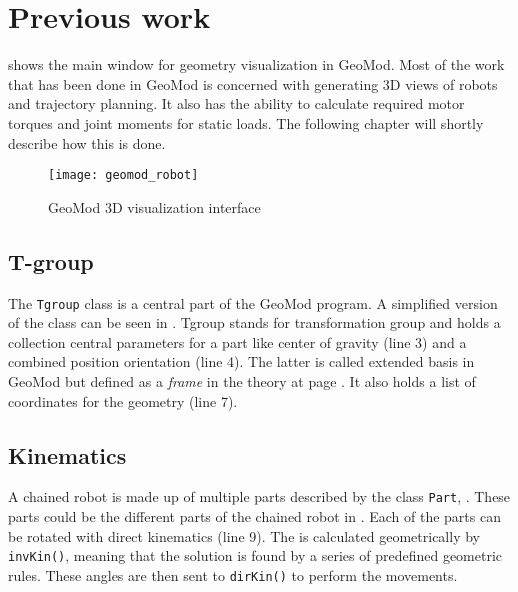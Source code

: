 \chapter{Previous work}\label{previous_work}

 shows the main window for geometry visualization in GeoMod. Most of the work that has been done in GeoMod is concerned with generating 3D views of robots and trajectory planning. It also has the ability to calculate required motor torques and joint moments for static loads. The following chapter will shortly describe how this is done. 

\begin{figure}
 \centering 
 \texttt{[image: geomod\_robot]}
 \caption{GeoMod 3D visualization interface}
 \label{geomod_interface}
\end{figure}

\section{T-group}


The \texttt{Tgroup} class is a central part of the GeoMod program. A simplified version of the class can be seen in . Tgroup stands for transformation group and holds a collection central parameters for a part like center of gravity (line 3) and a combined position orientation (line 4). The latter is called extended basis in GeoMod but defined as a \textit{frame} in the theory at page \pageref{secTheory}. It also holds a list of coordinates for the geometry (line 7).

\label{Tgroup}


\section{Kinematics}


A chained robot is made up of multiple parts described by the class \texttt{Part}, . These parts could be the different parts of the chained robot in . Each of the parts can be rotated with direct kinematics (line 9). The  is calculated geometrically by \texttt{invKin()}, meaning that the solution is found by a series of predefined geometric rules. These angles are then sent to \texttt{dirKin()} to perform the  movements.

